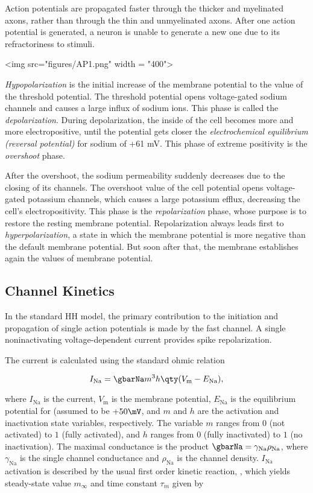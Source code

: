 Action potentials are propagated faster through the thicker and myelinated axons, rather than through the thin and unmyelinated axons. After one action potential is generated, a neuron is unable to generate a new one due to its refractoriness to stimuli.

<img src="figures/AP1.png" width = "400">


\textit{Hypopolarization} is the initial increase of the membrane potential to the value of the threshold potential. The threshold potential opens voltage-gated sodium channels and causes a large influx of sodium ions. This phase is called the \textit{depolarization}. During depolarization, the inside of the cell becomes more and more electropositive, until the potential gets closer the \textit{electrochemical equilibrium (reversal potential)} for sodium of +61 mV. This phase of extreme positivity is the \textit{overshoot} phase.

After the overshoot, the sodium permeability suddenly decreases due to the closing of its channels. The overshoot value of the cell potential opens voltage-gated potassium channels, which causes a large potassium efflux, decreasing the cell’s electropositivity. This phase is the \textit{repolarization} phase, whose purpose is to restore the resting membrane potential. Repolarization always leads first to \textit{hyperpolarization}, a state in which the membrane potential is more negative than the default membrane potential. But soon after that, the membrane establishes again the values of membrane potential.

\subsection{Channel Kinetics}

In the standard HH model, the primary contribution to the initiation and propagation of single action potentials is made by the fast \Na channel. A single noninactivating voltage-dependent \K current provides spike repolarization. 

The \Na current is calculated using the standard ohmic relation 

\begin{equation*}
    I_\mathrm{Na} = \gbarNa m^3 h \qty(V_\mathrm{m} - E_\mathrm{Na}),
\end{equation*}

where $I_\mathrm{Na}$ is the \Na current, $V_\mathrm{m}$ is the membrane potential, $E_\mathrm{Na}$ is the equilibrium potential for \Na (assumed to be $+50\mV$, and $m$ and $h$ are the activation and inactivation state variables, respectively. The variable $m$ ranges from $0$ (not activated) to $1$ (fully activated), and $h$ ranges from $0$ (fully inactivated) to $1$ (no inactivation). The maximal conductance is the product $\gbarNa = \gamma_\mathrm{Na} \rho_\mathrm{Na}$, where $\gamma_\mathrm{Na}$ is the single channel conductance and $\rho_\mathrm{Na}$ is the channel density. $I_\mathrm{Na}$ activation is described by the usual first order kinetic reaction, , which yields steady-state value $m_\infty$ and time constant $\tau_m$ given by 

